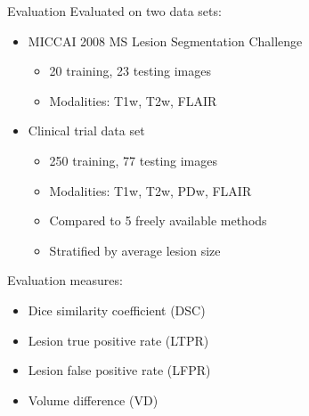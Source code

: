 \documentclass{beamer}
\begin{document}
\begin{frame}{Evaluation}
Evaluated on two data sets:
\begin{itemize}
\item MICCAI 2008 MS Lesion Segmentation Challenge
\begin{itemize}
\item 20 training, 23 testing images
\item Modalities: T1w, T2w, FLAIR 
\end{itemize}
\item Clinical trial data set
\begin{itemize}
\item 250 training, 77 testing images
\item Modalities: T1w, T2w, PDw, FLAIR
\item Compared to 5 freely available methods
\item Stratified by average lesion size
\end{itemize}
\end{itemize}
\vspace{0.5em}
Evaluation measures:
\begin{itemize}
\item Dice similarity coefficient (DSC)
\item Lesion true positive rate (LTPR)
\item Lesion false positive rate (LFPR)
\item Volume difference (VD)
\end{itemize}
\end{frame}

\end{document}
